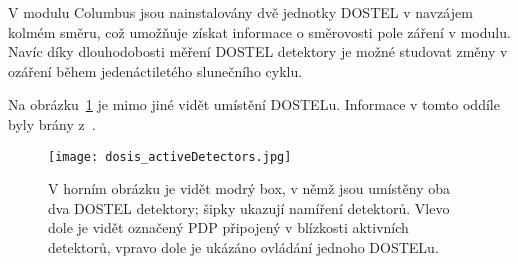 V modulu Columbus jsou nainstalovány dvě jednotky DOSTEL v navzájem kolmém směru, což umožňuje získat informace o směrovosti pole záření v modulu. Navíc díky dlouhodobosti měření DOSTEL detektory je možné studovat změny v ozáření během jedenáctiletého slunečního cyklu.

Na obrázku~\ref{fig:dosis_activeDetectors} je mimo jiné vidět umístění DOSTELu. Informace v tomto oddíle byly brány z~\cite{dosis,activeDetectors}. 
\begin{figure}[H]
  \centering
  \texttt{[image: dosis\_activeDetectors.jpg]}
  \caption{V horním obrázku je vidět modrý box, v němž jsou umístěny oba dva DOSTEL detektory; šipky ukazují namíření detektorů. Vlevo dole je vidět označený PDP připojený v blízkosti aktivních detektorů, vpravo dole je ukázáno ovládání jednoho DOSTELu.~\cite{dosis2}}
  \label{fig:dosis_activeDetectors}
\end{figure}



